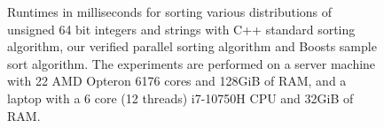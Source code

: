 \documentclass[runningheads]{llncs}
\begin{document}
  \begin{figure}

  \caption{Runtimes in milliseconds for sorting various distributions of unsigned 64 bit integers and strings with
    C++ standard sorting algorithm, our verified parallel sorting algorithm and Boosts sample sort algorithm.
    The experiments are performed on a server machine with 22 AMD Opteron 6176 cores and 128GiB of RAM, and a laptop with a
    6 core (12 threads) i7-10750H CPU and 32GiB of RAM.
  }\label{fig:benchres}
  \end{figure}
\end{document}
